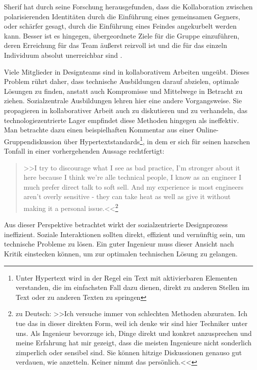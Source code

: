 Sherif hat durch seine Forschung herausgefunden, dass die Kollaboration zwischen polarisierenden Identitäten durch die Einführung eines gemeinsamen Gegners, oder schärfer gesagt, durch die Einführung eines Feindes angekurbelt werden kann. Besser ist es hingegen, übergeordnete Ziele für die Gruppe einzuführen, deren Erreichung für das Team äußerst reizvoll ist und die für das einzeln Individuum absolut unerreichbar sind \citep{Sherif:1966}.

Viele Mitglieder in Designteams sind in kollaborativem Arbeiten ungeübt. Dieses Problem rührt daher, dass technische Ausbildungen darauf abzielen, optimale Lösungen zu finden, anstatt auch Kompromisse und Mittelwege in Betracht zu ziehen. Sozialzentrale Ausbildungen lehren hier eine andere Vorgangsweise. Sie propagieren in kollaborativer Arbeit auch zu diskutieren und zu verhandeln, das technologiezentrierte Lager empfindet diese Methoden hingegen als ineffektiv. Man betrachte dazu einen beispielhaften Kommentar aus einer Online-Gruppendiskussion über Hypertextstandards\footnote{Unter Hypertext wird in der Regel ein Text mit aktivierbaren Elementen verstanden, die im einfachsten Fall dazu dienen, direkt zu anderen Stellen im Text oder zu anderen Texten zu springen}, in dem er sich für seinen harschen Tonfall in einer vorhergehenden Aussage rechtfertigt:

\begin{quote}
	>>I try to discourage what I see as bad practice, I'm stronger about it here because I think we're alle technical people, I know as an engineer I much prefer direct talk to soft sell. And my experience is most engineers aren't overly sensitive - they can take heat as well as give it without making it a personal issue.<<\footnote{zu Deutsch: >>Ich versuche immer von schlechten Methoden abzuraten. Ich tue das in dieser direkten Form, weil ich denke wir sind hier Techniker unter uns. Als Ingenieur bevorzuge ich, Dinge direkt und konkret anzusprechen und meine Erfahrung hat mir gezeigt, dass die meisten Ingenieure nicht sonderlich zimperlich oder sensibel sind. Sie können hitzige Diskussionen genauso gut verdauen, wie anzetteln. Keiner nimmt das persönlich.<<} \\\citep{Kilker:1999}
\end{quote}

Aus dieser Perspektive betrachtet wirkt der sozialzentrierte Designprozess ineffizient. Soziale Interaktionen sollten direkt, effizient und vernünftig sein, um technische Probleme zu lösen. Ein guter Ingenieur muss dieser Ansicht nach Kritik einstecken können, um zur optimalen technischen Lösung zu gelangen. 

